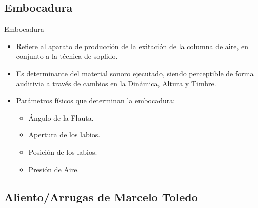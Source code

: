 \documentclass[aspectratio=169]{beamer}
\begin{document}
\subsection{Embocadura}

\begin{frame}{Embocadura}
  \begin{itemize}
  \item {
    Refiere al aparato de producción de la exitación de la columna de aire, en conjunto a la técnica de soplido.}
  \item {   
    Es determinante del material sonoro ejecutado, siendo perceptible de forma auditivia a través de cambios en la Dinámica, Altura y Timbre.
  }
  \item {
    Parámetros físicos que determinan la embocadura:
    \begin{itemize}
    	\item Ángulo de la Flauta.
     	\item Apertura de los labios.
     	\item Posición de los labios.
     	\item Presión de Aire.
    \end{itemize}
  }

  \end{itemize}
\end{frame}

\subsection{Aliento/Arrugas de Marcelo Toledo}
\end{document}
